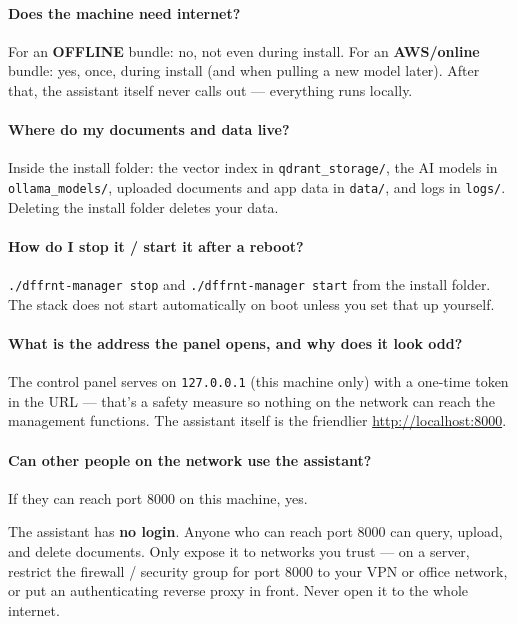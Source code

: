 \documentclass[11pt,letterpaper]{article}
\begin{document}
\paragraph{Does the machine need internet?}
For an \textbf{OFFLINE} bundle: no, not even during install. For an
\textbf{AWS/online} bundle: yes, once, during install (and when pulling a new
model later). After that, the assistant itself never calls out --- everything
runs locally.

\paragraph{Where do my documents and data live?}
Inside the install folder: the vector index in \texttt{qdrant\_storage/}, the
AI models in \texttt{ollama\_models/}, uploaded documents and app data in
\texttt{data/}, and logs in \texttt{logs/}. Deleting the install folder
deletes your data.

\paragraph{How do I stop it / start it after a reboot?}
\texttt{./dffrnt-manager stop} and \texttt{./dffrnt-manager start} from the
install folder. The stack does not start automatically on boot unless you set
that up yourself.

\paragraph{What is the address the panel opens, and why does it look odd?}
The control panel serves on \texttt{127.0.0.1} (this machine only) with a
one-time token in the URL --- that's a safety measure so nothing on the
network can reach the management functions. The assistant itself is the
friendlier \url{http://localhost:8000}.

\paragraph{Can other people on the network use the assistant?}
If they can reach port 8000 on this machine, yes.

\begin{gwarn}
The assistant has \textbf{no login}. Anyone who can reach port 8000 can query,
upload, and delete documents. Only expose it to networks you trust --- on a
server, restrict the firewall / security group for port 8000 to your VPN or
office network, or put an authenticating reverse proxy in front. Never open it
to the whole internet.
\end{gwarn}
\end{document}
